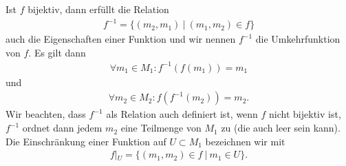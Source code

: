 \documentclass[letterpaper,10pt,english]{jupyterBook}
\begin{document}
Ist \(f\) bijektiv, dann erfüllt die Relation
\begin{equation*}
\begin{split} f^{-1} = \{(m_2,m_1) ~|~ (m_1,m_2) \in f\}\end{split}
\end{equation*}
auch die Eigenschaften einer Funktion und wir nennen \(f^{-1}\) die Umkehrfunktion von \(f\). Es gilt dann
\begin{equation*}
\begin{split}\forall m_1 \in M_1: f^{-1}(f(m_1))=m_1\end{split}
\end{equation*}
und
\begin{equation*}
\begin{split}\forall m_2 \in M_2: f(f^{-1}(m_2))=m_2.\end{split}
\end{equation*}
Wir beachten, dass \(f^{-1}\) als Relation auch definiert ist, wenn \(f\) nicht bijektiv ist, \(f^{-1}\) ordnet dann jedem \(m_2\) eine Teilmenge von \(M_1\) zu (die auch leer sein kann).
Die Einschränkung einer Funktion auf \(U \subset M_1\) bezeichnen wir mit
\begin{equation*}
\begin{split}f|_U = \{ (m_1,m_2) \in f~|~ m_1 \in U\}.\end{split}
\end{equation*}
\end{document}
